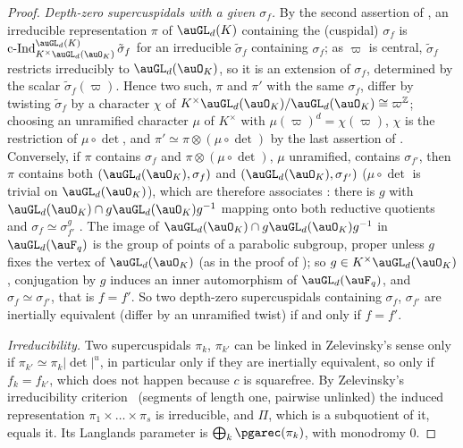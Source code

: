 \documentclass[10pt]{amsart}
\theoremstyle{definition}
\theoremstyle{remark}
\begin{document}
\begin{proof}
\emph{Depth-zero supercuspidals with a given $\sigma_f$.} By the second assertion of
\cite[Proposition~6.6]{MoyPrasad}, an irreducible representation $\pi$ of $\auGL_d(K)$ containing the
(cuspidal) $\sigma_f$ is $\operatorname{c-Ind}_{K^\times\auGL_d(\auO_K)}^{\auGL_d(K)}\tilde\sigma_f$
for an irreducible $\tilde\sigma_f$ containing $\sigma_f$; as $\varpi$ is central, $\tilde\sigma_f$
restricts irreducibly to $\auGL_d(\auO_K)$, so it is an extension of $\sigma_f$, determined by the
scalar $\tilde\sigma_f(\varpi)$. Hence two such, $\pi$ and $\pi'$ with the same $\sigma_f$, differ by
twisting $\tilde\sigma_f$ by a character $\chi$ of $K^\times\auGL_d(\auO_K)/\auGL_d(\auO_K)\cong
\varpi^{\mathbb Z}$; choosing an unramified character $\mu$ of $K^\times$ with $\mu(\varpi)^d=
\chi(\varpi)$, $\chi$ is the restriction of $\mu\circ\det$, and $\pi'\simeq\pi\otimes(\mu\circ\det)$
by the last assertion of \cite[Proposition~6.6]{MoyPrasad}. Conversely, if $\pi$ contains $\sigma_f$
and $\pi\otimes(\mu\circ\det)$, $\mu$ unramified, contains $\sigma_{f'}$, then $\pi$ contains both
$(\auGL_d(\auO_K),\sigma_f)$ and $(\auGL_d(\auO_K),\sigma_{f'})$ ($\mu\circ\det$ is trivial on
$\auGL_d(\auO_K)$), which are therefore associates \cite[Theorem~5.2, last assertion]{MoyPrasad94}:
there is $g$ with $\auGL_d(\auO_K)\cap g\auGL_d(\auO_K)g^{-1}$ mapping onto both reductive quotients
and $\sigma_f\simeq\sigma_{f'}^g$ \cite[\S3.4, definition of associates, (i)]{MoyPrasad}. The image of
$\auGL_d(\auO_K)\cap g\auGL_d(\auO_K)g^{-1}$ in $\auGL_d(\auF_q)$ is the group of points of a
parabolic subgroup, proper unless $g$ fixes the vertex of $\auGL_d(\auO_K)$ (as in the proof of
\cite[Proposition~6.6]{MoyPrasad}); so $g\in K^\times\auGL_d(\auO_K)$, conjugation by $g$ induces an
inner automorphism of $\auGL_d(\auF_q)$, and $\sigma_f\simeq\sigma_{f'}$, that is $f=f'$. So two
depth-zero supercuspidals containing $\sigma_f$, $\sigma_{f'}$ are inertially equivalent (differ by an
unramified twist) if and only if $f=f'$.

\emph{Irreducibility.} Two supercuspidals $\pi_k$, $\pi_{k'}$ can be linked in Zelevinsky's sense
only if $\pi_{k'}\simeq\pi_k|\det|^{u}$, in particular only if they are inertially equivalent, so
only if $f_k=f_{k'}$, which does not happen because $c$ is squarefree. By Zelevinsky's
irreducibility criterion~\cite[Theorem~4.2]{Zelevinsky} (segments of length one, pairwise unlinked) the
induced representation $\pi_1\times\dots\times\pi_s$ is irreducible, and $\Pi$, which is a
subquotient of it, equals it. Its Langlands parameter is $\bigoplus_k\pgarec(\pi_k)$, with
monodromy $0$.


\end{proof}
\end{document}
